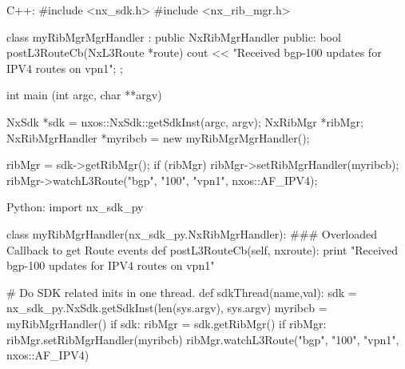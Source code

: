 \begin{DoxyCode}
  C++:
     #include <nx_sdk.h>
     #include <nx_rib_mgr.h>

     class myRibMgrMgrHandler : public NxRibMgrHandler {
        public:
           bool postL3RouteCb(NxL3Route *route) {
                cout << "Received bgp-100 updates for IPV4 routes on vpn1";
           }
     };

     int  main (int argc, char **argv)
     {
          NxSdk    *sdk = nxos::NxSdk::getSdkInst(argc, argv);
          NxRibMgr *ribMgr;
          NxRibMgrHandler *myribcb = new myRibMgrMgrHandler();

          ribMgr = sdk->getRibMgr();
          if (ribMgr) {
              ribMgr->setRibMgrHandler(myribcb);
              ribMgr->watchL3Route("bgp", "100", "vpn1", nxos::AF_IPV4);
          }
     }

  Python:
     import nx_sdk_py

     class myRibMgrHandler(nx_sdk_py.NxRibMgrHandler):
     ### Overloaded Callback to get Route events
           def postL3RouteCb(self, nxroute):
               print "Received bgp-100 updates for IPV4 routes on vpn1"

     # Do SDK related inits in one thread.
     def sdkThread(name,val):
         sdk = nx_sdk_py.NxSdk.getSdkInst(len(sys.argv), sys.argv)
         myribcb = myRibMgrHandler()
         if sdk:
            ribMgr = sdk.getRibMgr()
            if ribMgr:
               ribMgr.setRibMgrHandler(myribcb)
               ribMgr.watchL3Route("bgp", "100", "vpn1", nxos::AF_IPV4)
\end{DoxyCode}



